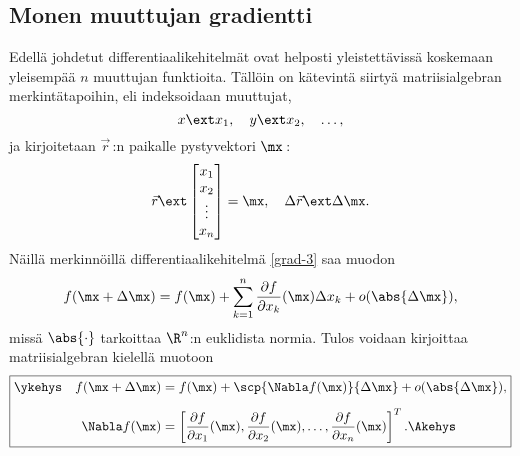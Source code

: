 \subsection*{Monen muuttujan gradientti}

Edellä johdetut differentiaalikehitelmät ovat helposti yleistettävissä koskemaan yleisempää
$n$ muuttujan funktioita. Tällöin on kätevintä siirtyä matriisialgebran merkintätapoihin, eli
indeksoidaan muuttujat,
\[
x \ext x_1,\quad y \ext x_2,\quad \ldots,
\]
ja kirjoitetaan $\vec r\,$:n paikalle pystyvektori $\mx\,$:
\[
\vec r \ext \begin{bmatrix} x_1 \\ x_2 \\ \vdots \\ x_n \end{bmatrix}=\mx,\quad 
\Delta\vec r \ext \Delta\mx.
\]
Näillä merkinnöillä differentiaalikehitelmä \eqref{grad-3} saa muodon
\[
f(\mx+\Delta\mx)
     =f(\mx)+\sum_{k=1}^n \frac{\partial f}{\partial x_k}(\mx)\Delta x_k+o(\abs{\Delta\mx}),
\]
missä $\abs{\cdot}$ tarkoittaa $\R^n$:n euklidista normia. Tulos voidaan kirjoittaa 
matriisialgebran kielellä muotoon
\begin{equation} \label{grad-4}
\boxed{\begin{aligned}
\ykehys\quad f(\mx+\Delta\mx)&=f(\mx)+\scp{\Nabla f(\mx)}{\Delta\mx}
                              +o(\abs{\Delta\mx}), \\[2mm]
             \Nabla f(\mx)   &=\left[\frac{\partial f}{\partial x_1}(\mx),
                                     \frac{\partial f}{\partial x_2}(\mx),\ldots,
                                     \frac{\partial f}{\partial x_n}(\mx)\right]^T.\Akehys\quad
       \end{aligned} }
\end{equation}

